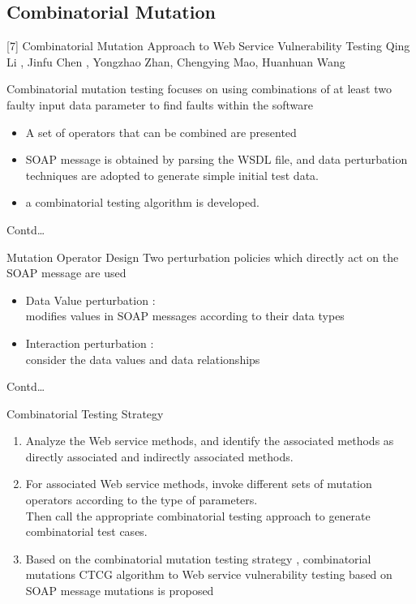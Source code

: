 \documentclass[10pt]{beamer}
\begin{document}
\subsection{Combinatorial Mutation}
\begin{frame}{[7] Combinatorial Mutation Approach to Web Service Vulnerability Testing }{Qing Li , Jinfu Chen , Yongzhao Zhan, Chengying Mao, Huanhuan Wang}

Combinatorial mutation
testing focuses on using combinations of at least two faulty
input data parameter to find faults within the software
\begin{itemize}
\item A set of operators that can be combined are presented
\item SOAP message is obtained by parsing the WSDL file, and data perturbation techniques are adopted to generate simple initial test data.
\item a combinatorial testing algorithm is developed.
\end{itemize}

\end{frame}
\begin{frame}{Contd\dots}
\begin{block}{Mutation Operator Design}
Two perturbation policies which directly act on the SOAP message are used
\begin{itemize}
\item Data Value perturbation :\\
modifies
values in SOAP messages according to their data types
\item Interaction perturbation :\\
consider the data values and data relationships
\end{itemize}
\end{block}
\end{frame}

\begin{frame}{Contd\dots}
\begin{block}{Combinatorial Testing Strategy}
\begin{enumerate}
\item Analyze the Web service methods, and identify
the associated methods as directly associated and indirectly associated methods.
\item For associated Web service methods, invoke
different sets of mutation operators according to the type of parameters.\\
Then call the appropriate combinatorial testing approach to generate combinatorial test cases.
\item Based on the combinatorial mutation testing strategy , combinatorial mutations CTCG algorithm
to Web service vulnerability testing based on SOAP message mutations is proposed
\end{enumerate}
\end{block}
\end{frame}
\end{document}
